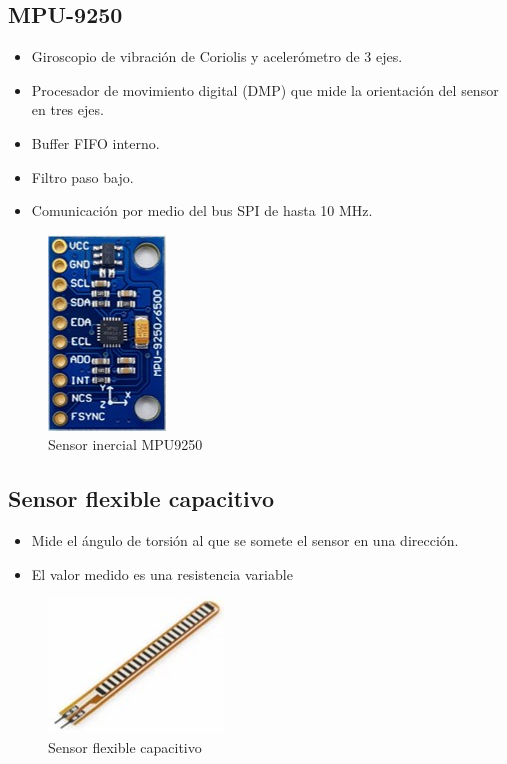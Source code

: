 \documentclass[12pt]{report}
\begin{document}
\subsection*{MPU-9250}
\begin{itemize}
	
	\item Giroscopio de vibración de Coriolis y acelerómetro de 3 ejes.
	
	\item Procesador de movimiento digital (DMP) que mide la orientación del sensor en tres ejes.
	
	\item Buffer FIFO interno.
	
	\item Filtro paso bajo.
	
	\item Comunicación por medio del bus SPI de hasta 10 MHz. \newline\newline
	
\end{itemize}

\begin{figure}[htb]
	\centering
	\includegraphics[scale=0.4]{mpu9250.jpg}
	\caption{Sensor inercial MPU9250}
\end{figure}

\subsection*{Sensor flexible capacitivo}
\begin{itemize}
	
	\item Mide el ángulo de torsión al que se somete el sensor en una dirección.
	\item El valor medido es una resistencia variable
	
\end{itemize}

\begin{figure}[htb]
	\centering
	\includegraphics[scale=0.6]{flexsensor.jpg}
	\caption{Sensor flexible capacitivo}
\end{figure}
\end{document}
